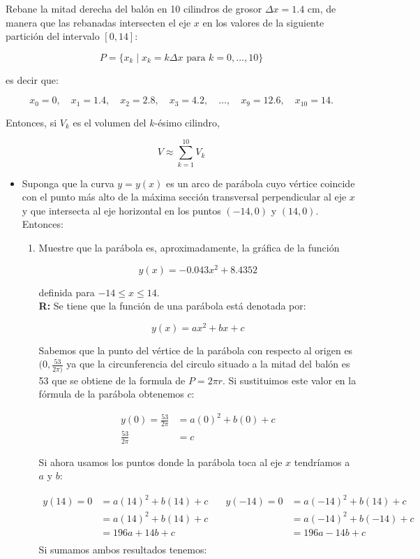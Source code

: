 \documentclass[12pt]{article}
\begin{document}
Rebane la mitad derecha del balón en 10 cilindros de grosor \( \Delta x = 1.4 \) cm, de manera que las rebanadas intersecten el eje \( x \) en los valores de la siguiente partición del intervalo \([0, 14]\):

\[
P = \{x_k \mid x_k = k \Delta x \text{ para } k = 0, \ldots, 10\}
\]

es decir que:

\[
x_0 = 0, \quad x_1 = 1.4, \quad x_2 = 2.8, \quad x_3 = 4.2, \quad \ldots, \quad x_9 = 12.6, \quad x_{10} = 14.
\]

Entonces, si \( V_k \) es el volumen del \( k \)-ésimo cilindro,

\[
V \approx \sum_{k=1}^{10} V_k
\]
\begin{itemize}
\item Suponga que la curva \( y = y(x) \) es un arco de parábola cuyo vértice coincide con el punto más alto de la máxima sección transversal perpendicular al eje \( x \) y que intersecta al eje horizontal en los puntos \((-14, 0)\) y \((14, 0)\). Entonces:

\begin{enumerate}
    \item Muestre que la parábola es, aproximadamente, la gráfica de la función

\[
y(x) = -0.043 x^2 + 8.4352
\]

definida para \(-14 \leq x \leq 14\).\\
{\bf R:} Se tiene que la función de una parábola está denotada por:

\[ y(x)=ax^2+bx+c\]

Sabemos que la punto del vértice de la parábola con respecto al origen es $(0, \frac{53}{2\pi)}$ ya que la circunferencia del circulo situado a la mitad del  balón es 53 que se obtiene de la formula de  $P = 2\pi r$. Si sustituimos este valor en la fórmula de la parábola obtenemos $c$:

        \begin{align*}
            y(0)= \frac{53}{2\pi} &= a(0)^2+b(0)+c\\
            \frac{53}{2\pi} &= c
        \end{align*}
  
        Si ahora usamos los puntos donde la parábola toca al eje $x$ tendríamos a $a$ y $b$:
        
       \begin{align*}
            y(14)=0&= a(14)^2+b(14)+c &\quad y(-14)=0&= a(-14)^2+b(14)+c\\
             &= a(14)^2+b(14)+c &\quad &= a(-14)^2+b(-14)+c\\
            &= 196a+14b+c &\quad &= 196a-14b+c\\ 
        \end{align*}
            Si sumamos ambos resultados tenemos:\\
            

\end{enumerate}
\end{itemize}
\end{document}
